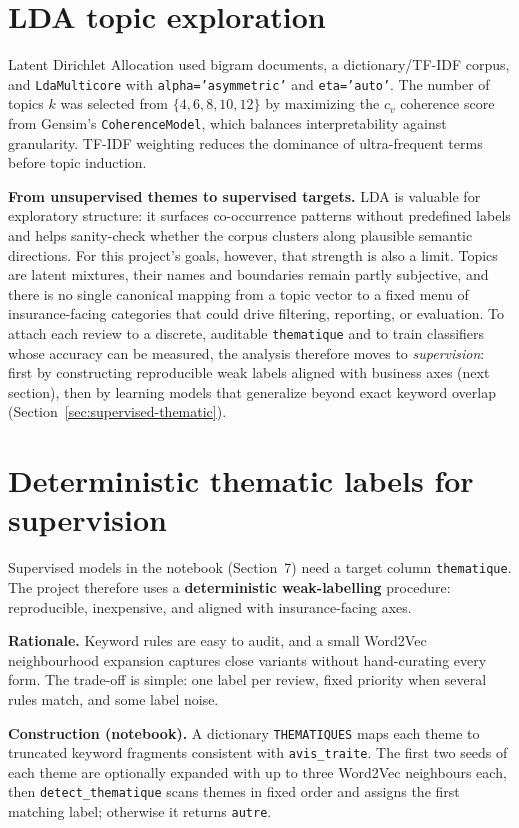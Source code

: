 \documentclass[11pt,a4paper]{article}
\begin{document}
\section{LDA topic exploration}
Latent Dirichlet Allocation used bigram documents, a dictionary/TF-IDF corpus, and \texttt{LdaMulticore} with \texttt{alpha='asymmetric'} and \texttt{eta='auto'}. The number of topics $k$ was selected from $\{4,6,8,10,12\}$ by maximizing the $c_v$ coherence score from Gensim's \texttt{CoherenceModel}, which balances interpretability against granularity. TF-IDF weighting reduces the dominance of ultra-frequent terms before topic induction.

\textbf{From unsupervised themes to supervised targets.} LDA is valuable for exploratory structure: it surfaces co-occurrence patterns without predefined labels and helps sanity-check whether the corpus clusters along plausible semantic directions. For this project's goals, however, that strength is also a limit. Topics are latent mixtures, their names and boundaries remain partly subjective, and there is no single canonical mapping from a topic vector to a fixed menu of insurance-facing categories that could drive filtering, reporting, or evaluation. To attach each review to a discrete, auditable \texttt{thematique} and to train classifiers whose accuracy can be measured, the analysis therefore moves to \emph{supervision}: first by constructing reproducible weak labels aligned with business axes (next section), then by learning models that generalize beyond exact keyword overlap (Section~\ref{sec:supervised-thematic}).

\section{Deterministic thematic labels for supervision}
\label{sec:deterministic-labels}
Supervised models in the notebook (Section~7) need a target column \texttt{thematique}. The project therefore uses a \textbf{deterministic weak-labelling} procedure: reproducible, inexpensive, and aligned with insurance-facing axes.

\textbf{Rationale.} Keyword rules are easy to audit, and a small Word2Vec neighbourhood expansion captures close variants without hand-curating every form. The trade-off is simple: one label per review, fixed priority when several rules match, and some label noise.

\textbf{Construction (notebook).} A dictionary \texttt{THEMATIQUES} maps each theme to truncated keyword fragments consistent with \texttt{avis\_traite}. The first two seeds of each theme are optionally expanded with up to three Word2Vec neighbours each, then \texttt{detect\_thematique} scans themes in fixed order and assigns the first matching label; otherwise it returns \texttt{autre}.
\end{document}
